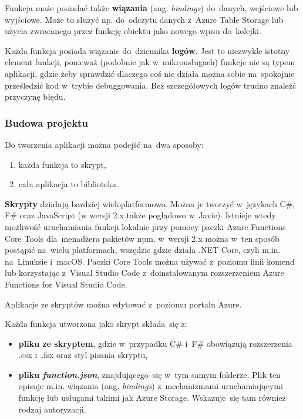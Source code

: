 \documentclass[12pt,a4paper,twoside,titlepage,openright]{book}
\begin{document}
Funkcja może posiadać także \textbf{wiązania} (ang. \textit{bindings}) do~danych, wejściowe lub wyjściowe. Może to służyć np. do~odczytu danych z~Azure Table Storage lub użycia zwracanego przez funkcję obiektu jako nowego wpisu do~kolejki. \cite{siteAppBindings}

Każda funkcja posiada wiązanie do~dziennika \textbf{logów}. Jest to niezwykle istotny element funkcji, ponieważ (podobnie jak w~mikrousługach) funkcje nie są typem aplikacji, gdzie żeby sprawdzić dlaczego coś nie działa można sobie na~spokojnie prześledzić kod w~trybie debuggowania. Bez szczegółowych logów trudno znaleźć przyczynę błędu.

\subsubsection{Budowa projektu}



Do tworzenia aplikacji można podejść na~dwa sposoby: \cite{siteAppLanguages}
\begin{enumerate}
\item każda funkcja to skrypt,
\item cała aplikacja to biblioteka.
\end{enumerate}

\textbf{Skrypty} działają bardziej wieloplatformowo. Można je tworzyć w~językach C\#, F\# oraz JavaScript (w wersji 2.x także poglądowo w~Javie). Istnieje wtedy możliwość uruchamiania funkcji lokalnie przy pomocy paczki Azure Functions Core Tools dla~menadżera pakietów npm. w~wersji 2.x można w~ten sposób postąpić na~wielu platformach, wszędzie gdzie działa .NET Core, czyli m.in. na~Linuksie i~macOS. Paczki Core Tools można używać z~poziomu linii komend lub korzystając z~Visual Studio Code z~doinstalowanym rozszerzeniem Azure Functions for Visual Studio Code.\cite{siteAppLocally} 

Aplikacje ze skryptów można edytować z~poziomu portalu Azure.

Każda funkcja utworzona jako skrypt składa~się z:
\begin{itemize}
\item \textbf{pliku ze skryptem}, gdzie w~przypadku C\# i~F\# obowiązują rozszerzenia .csx i~.fsx oraz styl pisania skryptu,
\item \textbf{pliku \textit{function.json}}, znajdującego~się w~tym samym folderze. Plik ten opisuje m.in. wiązania (ang. \textit{bindings}) z~mechanizmami uruchamiającymi funkcję lub usługami takimi jak Azure Storage. Wskazuje~się tam również rodzaj autoryzacji.
\end{itemize}
\end{document}
